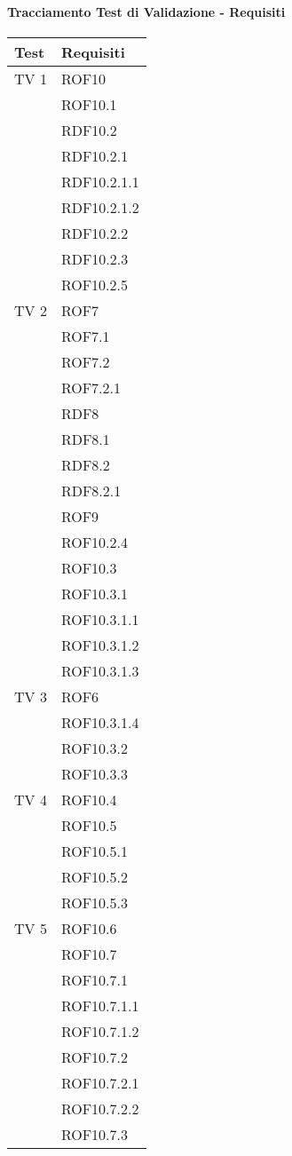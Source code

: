 \paragraph{Tracciamento Test di Validazione - Requisiti}
\begin{center}
\begin{longtable}{|p{7cm}|p{7cm}|}
\toprule
\textbf{Test} & \textbf{Requisiti}\\
\midrule
TV 1 & ROF10\\ & ROF10.1\\ & RDF10.2\\ & RDF10.2.1\\ &  RDF10.2.1.1\\ &  RDF10.2.1.2\\ &  RDF10.2.2 \\ & RDF10.2.3\\ &   ROF10.2.5\\
\midrule
TV 2 & ROF7\\ &  ROF7.1\\ &  ROF7.2\\ &  ROF7.2.1\\ &  RDF8\\ &  RDF8.1\\ &  RDF8.2\\ &  RDF8.2.1\\ &  ROF9\\ &  ROF10.2.4\\ &  ROF10.3\\ &  ROF10.3.1\\ &  ROF10.3.1.1\\ &  ROF10.3.1.2\\ &  ROF10.3.1.3\\
\midrule
TV 3 & ROF6\\ &  ROF10.3.1.4\\ &  ROF10.3.2\\ &  ROF10.3.3\\
\midrule
TV 4 &  ROF10.4\\ &  ROF10.5\\ &  ROF10.5.1\\ &  ROF10.5.2\\ &  ROF10.5.3\\
\midrule
TV 5 &  ROF10.6\\ &  ROF10.7\\ &  ROF10.7.1\\ &  ROF10.7.1.1\\ &  ROF10.7.1.2\\ &  ROF10.7.2\\ &  ROF10.7.2.1\\ &  ROF10.7.2.2\\ &  ROF10.7.3\\

\end{longtable}
\end{center}
